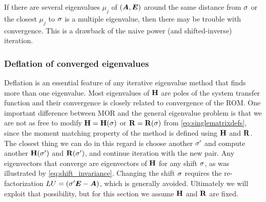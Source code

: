 If there are several eigenvalues $\mu_j$ of $(\bm{A},\bm{E})$ around the same distance from $\sigma$ or the closest $\mu_j$ to $\sigma$ is a multiple eigenvalue, then there may be trouble with convergence.  This is a drawback of the naive power (and shifted-inverse) iteration. 
   



\subsubsection{Deflation of converged eigenvalues}\label{sec:deflation} 
Deflation is an essential feature of any iterative eigenvalue method that finds more than one eigenvalue.   Most eigenvalues of $\textbf{\textup{H}}$ are poles of the system transfer function and their convergence is closely related to convergence of the ROM.  One important difference between MOR and the general eigenvalue problem is that we are not as free to modify $\textbf{\textup{H}}=\textbf{\textup{H}}(\sigma)$ or $\textbf{\textup{R}}=\textbf{\textup{R}}(\sigma)$ from  \eqref{eq:singlematrixdefs}, since the moment matching property of the method is defined using $\textbf{\textup{H}}$ and $\textbf{\textup{R}}$.  The closest thing we can do in this regard is choose another $\sigma^\prime$ and compute another $\textbf{\textup{H}}(\sigma^\prime)$ and $\textbf{\textup{R}}(\sigma^\prime)$, and continue iteration with the new pair.   Any eigenvectors that converge are eigenvectors of $\textbf{\textup{H}}$ for any shift $\sigma$, as was illustrated by \eqref{eq:shift_invariance}.  Changing the shift $\sigma$ requires the  re-factorization $LU = (\sigma^\prime \bm{E} - \bm{A})$, which is generally avoided.   Ultimately we will exploit that possibility, but for this section we assume $\textbf{\textup{H}}$ and $\textbf{\textup{R}}$ are fixed. 

